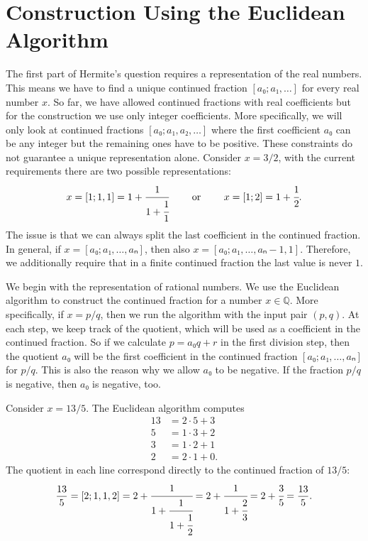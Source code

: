 \section{Construction Using the Euclidean Algorithm}
\label{sec:cf-construction}

The first part of Hermite's question requires a representation of the real numbers.
This means we have to find a unique continued fraction $[a₀; a₁, …]$ for every real number $x$.
So far, we have allowed continued fractions with real coefficients
but for the construction we use only integer coefficients.
More specifically, we will only look at continued fractions $[a₀; a₁, a₂, …]$
where the first coefficient $a₀$ can be any integer but the remaining ones have to be positive.
These constraints do not guarantee a unique representation alone.
Consider $x = 3/2$, with the current requirements there are two possible representations:
\[
  x = [1; 1, 1] = 1 + \cfrac{1}{1 + \cfrac{1}{1}} \qquad \text{ or } \qquad x = [1; 2] = 1 + \cfrac{1}{2}.
\]
The issue is that we can always split the last coefficient in the continued fraction.
In general, if $x = [a₀; a₁, …, aₙ]$, then also $x = [a₀; a₁, …, aₙ - 1, 1]$.
Therefore, we additionally require that in a finite continued fraction the last value is never $1$.

We begin with the representation of rational numbers.
We use the Euclidean algorithm to construct the continued fraction for a number $x ∈ ℚ$.
More specifically, if $x = p/q$, then we run the algorithm with the input pair $(p, q)$.
At each step, we keep track of the quotient,
which will be used as a coefficient in the continued fraction.
So if we calculate $p = a₀q + r$ in the first division step, then the quotient $a₀$ will be
the first coefficient in the continued fraction $[a₀; a₁, …, aₙ]$ for $p/q$.
This is also the reason why we allow $a₀$ to be negative.
If the fraction $p/q$ is negative, then $a₀$ is negative, too.

\begin{example}
  \label{ex:euclidean-cf}
  Consider $x = 13/5$.
  The Euclidean algorithm computes
  \begin{align*}
    13 & = 2 · 5 + 3 \\
     5 & = 1 · 3 + 2 \\
     3 & = 1 · 2 + 1 \\
     2 & = 2 · 1 + 0.
  \end{align*}
  The quotient in each line correspond directly to the continued fraction of $13/5$:
  \[
    \frac{13}{5}
    = [2; 1, 1, 2]
    = 2 + \cfrac{1}{1 + \cfrac{1}{1 + \cfrac{1}{2}}}
    = 2 + \cfrac{1}{1 + \cfrac{2}{3}}
    = 2 + \cfrac{3}{5}
    = \frac{13}{5}.
  \]
\end{example}


